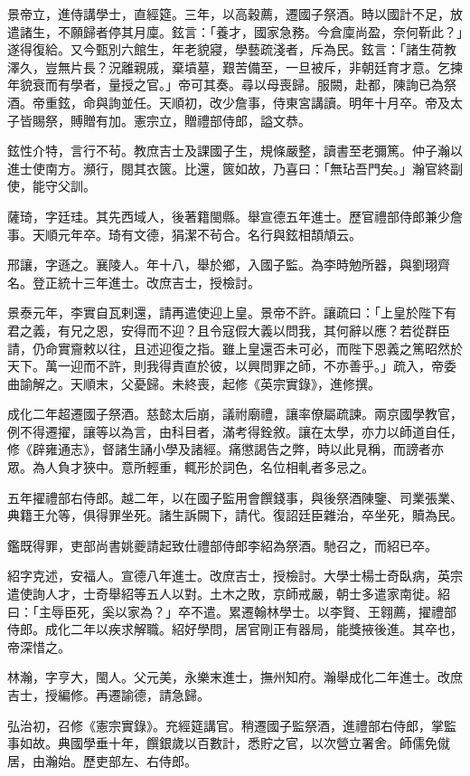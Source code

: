 \begin{pinyinscope}
景帝立，進侍講學士，直經筵。三年，以高穀薦，遷國子祭酒。時以國計不足，放遣諸生，不願歸者停其月廩。鉉言：「養才，國家急務。今倉廩尚盈，奈何靳此？」遂得復給。又今甄別六館生，年老貌寢，學藝疏淺者，斥為民。鉉言：「諸生荷教澤久，豈無片長？況離親戚，棄墳墓，艱苦備至，一旦被斥，非朝廷育才意。乞揀年貌衰而有學者，量授之官。」帝可其奏。尋以母喪歸。服闕，赴都，陳詢已為祭酒。帝重鉉，命與詢並任。天順初，改少詹事，侍東宮講讀。明年十月卒。帝及太子皆賜祭，賻贈有加。憲宗立，贈禮部侍郎，謚文恭。

鉉性介特，言行不茍。教庶吉士及課國子生，規條嚴整，讀書至老彌篤。仲子瀚以進士使南方。瀕行，閱其衣篋。比還，篋如故，乃喜曰：「無玷吾門矣。」瀚官終副使，能守父訓。

薩琦，字廷珪。其先西域人，後著籍閩縣。舉宣德五年進士。歷官禮部侍郎兼少詹事。天順元年卒。琦有文德，狷潔不茍合。名行與鉉相頡頏云。

邢讓，字遜之。襄陵人。年十八，舉於鄉，入國子監。為李時勉所器，與劉珝齊名。登正統十三年進士。改庶吉士，授檢討。

景泰元年，李實自瓦剌還，請再遣使迎上皇。景帝不許。讓疏曰：「上皇於陛下有君之義，有兄之恩，安得而不迎？且令寇假大義以問我，其何辭以應？若從群臣請，仍命實齎敕以往，且述迎復之指。雖上皇還否未可必，而陛下恩義之篤昭然於天下。萬一迎而不許，則我得責直於彼，以興問罪之師，不亦善乎。」疏入，帝委曲諭解之。天順末，父憂歸。未終喪，起修《英宗實錄》，進修撰。

成化二年超遷國子祭酒。慈懿太后崩，議祔廟禮，讓率僚屬疏諫。兩京國學教官，例不得遷擢，讓等以為言，由科目者，滿考得銓敘。讓在太學，亦力以師道自任，修《辟雍通志》，督諸生誦小學及諸經。痛懲謁告之弊，時以此見稱，而謗者亦眾。為人負才狹中。意所輕重，輒形於詞色，名位相軋者多忌之。

五年擢禮部右侍郎。越二年，以在國子監用會饌錢事，與後祭酒陳鑒、司業張業、典籍王允等，俱得罪坐死。諸生訴闕下，請代。復詔廷臣雜治，卒坐死，贖為民。

鑑既得罪，吏部尚書姚夔請起致仕禮部侍郎李紹為祭酒。馳召之，而紹已卒。

紹字克述，安福人。宣德八年進士。改庶吉士，授檢討。大學士楊士奇臥病，英宗遣使詢人才，士奇舉紹等五人以對。土木之敗，京師戒嚴，朝士多遣家南徙。紹曰：「主辱臣死，奚以家為？」卒不遣。累遷翰林學士。以李賢、王翱薦，擢禮部侍郎。成化二年以疾求解職。紹好學問，居官剛正有器局，能獎掖後進。其卒也，帝深惜之。

林瀚，字亨大，閩人。父元美，永樂末進士，撫州知府。瀚舉成化二年進士。改庶吉士，授編修。再遷諭德，請急歸。

弘治初，召修《憲宗實錄》。充經筵講官。稍遷國子監祭酒，進禮部右侍郎，掌監事如故。典國學垂十年，饌銀歲以百數計，悉貯之官，以次營立署舍。師儒免僦居，由瀚始。歷吏部左、右侍郎。


\end{pinyinscope}
